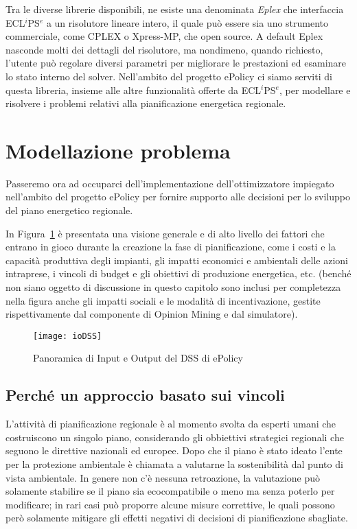 Tra le diverse librerie disponibili, ne esiste una denominata \emph{Eplex} \cite{eplex} che interfaccia ECL$^i$PS$^e$ a un risolutore lineare intero, il quale può essere sia uno strumento commerciale, come CPLEX o Xpress-MP, che open source. A default Eplex nasconde molti dei dettagli del risolutore, ma nondimeno, quando richiesto, l'utente può regolare diversi parametri per migliorare le prestazioni ed esaminare lo stato interno del solver. Nell'ambito del progetto ePolicy ci siamo serviti di questa libreria, insieme alle altre funzionalità offerte da ECL$^i$PS$^e$, per modellare e risolvere i problemi relativi alla pianificazione energetica regionale.

\section{Modellazione problema}

Passeremo ora ad occuparci dell'implementazione dell'ottimizzatore impiegato nell'ambito del progetto ePolicy per fornire supporto alle decisioni per lo sviluppo del piano energetico regionale.

In Figura~\ref{ioDSS} è presentata una visione generale e di alto livello dei fattori che entrano in gioco durante la creazione la fase di pianificazione, come i costi e la capacità produttiva degli impianti, gli impatti economici e ambientali delle azioni intraprese, i vincoli di budget e gli obiettivi di produzione energetica, etc. (benché non siano oggetto di discussione in questo capitolo sono inclusi per completezza nella figura anche gli impatti sociali e le modalità di incentivazione, gestite rispettivamente dal componente di Opinion Mining e dal simulatore).

\begin{figure}[h]
	\centering
	\texttt{[image: ioDSS]}
	\caption{Panoramica di Input e Output del DSS di ePolicy}
	\label{ioDSS}
\end{figure}

\subsection[Approccio a vincoli]{\nohyphens{Perché un approccio basato sui vincoli}}
L'attività di pianificazione regionale è al momento svolta da esperti umani che costruiscono un singolo piano, considerando gli obbiettivi strategici regionali che seguono le direttive nazionali ed europee. Dopo che il piano è stato ideato l'ente per la protezione ambientale è chiamata a valutarne la sostenibilità dal punto di vista ambientale. In genere non c'è nessuna retroazione, la valutazione può solamente stabilire se il piano sia ecocompatibile o meno ma senza poterlo per modificare; in rari casi può proporre alcune misure correttive, le quali possono però solamente mitigare gli effetti negativi di decisioni di pianificazione sbagliate.

